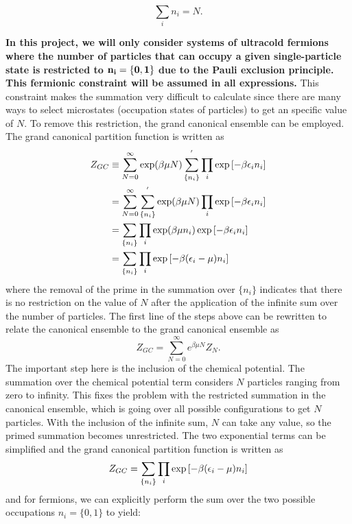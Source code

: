 \begin{equation}  
    \sum_i n_i=N.
\end{equation}

\textbf{In this project, we will only consider systems of ultracold fermions where the number of particles that can occupy a given single-particle state is restricted to $\bold{n_i=\{0,1\}}$ due to the Pauli exclusion principle. This fermionic constraint will be assumed in all expressions.} 
This constraint makes the summation very difficult to calculate since there are many ways to select microstates (occupation states of particles) to get an specific value of $N$. To remove this restriction, the grand canonical ensemble can be employed. The grand canonical partition function is written as 
\begin{align}
    Z_{GC}&\equiv\sum_{N=0}^{\infty} \exp(\beta\mu N) \sum_{\{n_i\}}^{'} \prod_i \exp\qty[-\beta\epsilon_i n_i]\nonumber\\
    &=\sum_{N=0}^{\infty}\sum_{\{n_i\}}^{'} \exp(\beta\mu N) \prod_i \exp\qty[-\beta\epsilon_i n_i]\nonumber\\
    &=\sum_{\{n_i\}} \prod_i \exp(\beta\mu n_i) \exp\qty[-\beta\epsilon_i n_i]\nonumber\\
    &=\sum_{\{n_i\}} \prod_i \exp\qty[-\beta\qty(\epsilon_i-\mu)n_i]
\end{align}
where the removal of the prime in the summation over $\{n_i\}$ indicates that there is no restriction on the value of $N$ after the application of the infinite sum over the number of particles. The first line of the steps above can be rewritten to relate the canonical ensemble to the grand canonical ensemble as
\begin{equation}
    Z_{GC}=\sum_{N=0}^{\infty} e^{\beta\mu N} Z_N.
\end{equation}
 The important step here is the inclusion of the chemical potential. The summation over the chemical potential term considers $N$ particles ranging from zero to infinity. This fixes the problem with the restricted summation in the canonical ensemble, which is going over all possible configurations to get $N$ particles. With the inclusion of the infinite sum, $N$ can take any value, so the primed summation becomes unrestricted. The two exponential terms can be simplified and the grand canonical partition function is written as 
\begin{equation}
    Z_{GC}=\sum_{\{n_i\}} \prod_i \exp\qty[-\beta\qty(\epsilon_i-\mu)n_i] \label{ZGC}
\end{equation}
and for fermions, we can explicitly perform the sum over the two possible occupations $n_i=\{0,1\}$ to yield:
